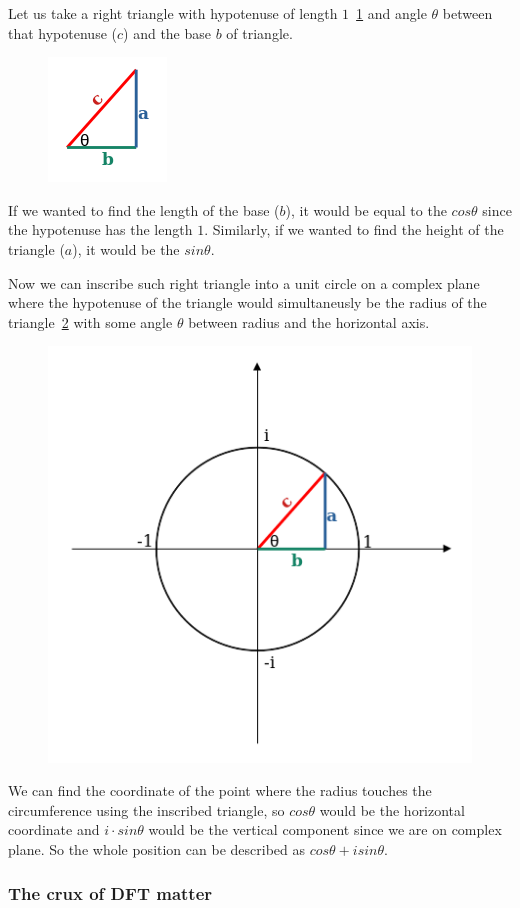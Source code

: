 \documentclass{article}
\begin{document}
    Let us take a right triangle with hypotenuse of length $1$~\ref{fig:right_triangle}
    and angle $\theta$ between that hypotenuse ($c$) and the base $b$ of triangle.
    \begin{figure}[H]
        \caption{}
        \centering
        \includegraphics[width=0.2\linewidth]{right_triangle}
        \label{fig:right_triangle}
    \end{figure}
    If we wanted to find the length of the base ($b$), it would be equal
    to the $cos\theta$ since the hypotenuse has the length $1$. Similarly, if we
    wanted to find the height of the triangle ($a$), it would be the $sin\theta$.

    Now we can inscribe such right triangle into a unit circle on a complex plane
    where the hypotenuse of the triangle would simultaneusly be the radius of 
    the triangle~\ref{fig:inscribed_triangle} with some angle $\theta$ between
    radius and the horizontal axis.
    \begin{figure}[H]
        \caption{}
        \centering
        \includegraphics[width=0.4\linewidth]{inscribed_triangle}
        \label{fig:inscribed_triangle}
    \end{figure}
    We can find the coordinate of the point where the radius touches the circumference
    using the inscribed triangle, so $cos\theta$ would be the horizontal coordinate
    and $i \cdot sin\theta$ would be the vertical component since we are on complex
    plane. So the whole position can be described as $cos\theta + isin\theta$.


\subsubsection{The crux of DFT matter}
\end{document}
